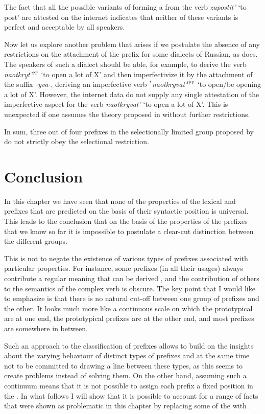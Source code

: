 The fact that all the possible variants of forming a  from the verb \textit{zapostit'} `to post' are attested on the internet indicates that neither of these variants is perfect and acceptable by all speakers.

Now let us explore another problem that arises if we postulate the absence of any restrictions on the attachment of the prefix  for some dialects of Russian, as \citet{Tatevosov:13a} does. The speakers of such a dialect should be able, for example, to derive the verb \textit{naotkryt'}$^{\textsc{pf}}$ `to open a lot of X' and then imperfectivize it by the attachment of the suffix \textit{-yva-}, deriving an imperfective verb $^*$\textit{naotkryvat'}$^{\textsc{ipf}}$ `to open/be opening a lot of X'. However, the internet data do not supply any single attestation of the imperfective aspect for the verb \textit{naotkryvat'} `to open a lot of X'. This is unexpected if one assumes the theory proposed in \citet{Tatevosov:13a} without further restrictions.

In sum, three out of four prefixes in the selectionally limited group proposed by \citet{Tatevosov:09} do not strictly obey the selectional restriction. 

\section{Conclusion}\label{section:new:conclusion}
In this chapter we have seen that none of the properties of the lexical and  prefixes that are predicted on the basis of their syntactic position is universal. This leads to the conclusion that on the basis of the properties of the prefixes that we know so far it is impossible to postulate a clear-cut distinction between the different groups. 

This is not to negate the existence of various types of prefixes associated with particular properties. For instance, some prefixes (in all their usages) always contribute a regular meaning that can be derived , and the contribution of others to the semantics of the complex verb is obscure. The key point that I would like to emphasize is that there is no natural cut-off between one group of prefixes and the other. It looks much more like a continuous scale on which the prototypical  are at one end, the prototypical  prefixes are at the other end, and most prefixes are somewhere in between. 

Such an approach to the classification of prefixes allows to build on the insights about the varying behaviour of distinct types of prefixes and at the same time not to be committed to drawing a line between these types, as this seems to create problems instead of solving them. On the other hand, assuming such a continuum means that it is not possible to assign each prefix a fixed position in the . In what follows I will show that it is possible to account for a range of facts that were shown as problematic in this chapter by replacing some of the  with .
